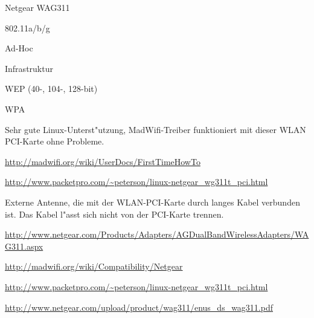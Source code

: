 %
%
\begin{wlandevice}{Netgear WAG311}



\begin{wlanieeestandard}
\item 802.11a/b/g
\end{wlanieeestandard}

\begin{wlanmode}
\item Ad-Hoc
\item Infrastruktur
\end{wlanmode}

\begin{wlansecurity}
\item WEP (40-, 104-, 128-bit)
\item WPA
\end{wlansecurity}

\begin{wlandriver}
\item
Sehr gute Linux-Unterst"utzung, MadWifi-Treiber funktioniert
mit dieser WLAN PCI-Karte ohne Probleme.
\end{wlandriver}


\begin{wlaninstall}
\item
\url{http://madwifi.org/wiki/UserDocs/FirstTimeHowTo}

\url{http://www.packetpro.com/~peterson/linux-netgear_wg311t_pci.html}
\end{wlaninstall}

\begin{wlanextrainfo}
\item
Externe Antenne, die mit der WLAN-PCI-Karte durch langes Kabel verbunden ist.
Das Kabel l"asst sich nicht von der PCI-Karte trennen.
\end{wlanextrainfo}

\begin{wlanlink}
\item \url{http://www.netgear.com/Products/Adapters/AGDualBandWirelessAdapters/WAG311.aspx}
\item \url{http://madwifi.org/wiki/Compatibility/Netgear}
\item \url{http://www.packetpro.com/~peterson/linux-netgear_wg311t_pci.html}
\item \url{http://www.netgear.com/upload/product/wag311/enus_ds_wag311.pdf}
\end{wlanlink}

\end{wlandevice}


